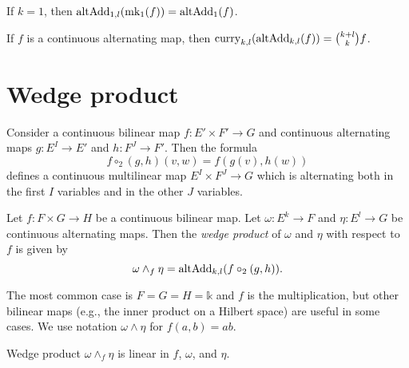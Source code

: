 \begin{theorem}
  If \(k = 1\), then \(\operatorname{altAdd}_{1, l}(\operatorname{mk_1}(f)) = \operatorname{altAdd}_{1}(f)\).
\end{theorem}

\begin{theorem}
  If \(f\) is a continuous alternating map, then \(\operatorname{curry}_{k, l}(\operatorname{altAdd}_{k, l}(f)) = \binom{k + l}{k}f\).
\end{theorem}

\section{Wedge product}%
\label{sec:wedge-product}

\begin{definition}
  Consider a continuous bilinear map \(f \colon E' \times F' \to G\)
  and continuous alternating maps \(g\colon E^{I}\to E'\) and \(h\colon F^{J}\to F'\).
  Then the formula
  \[
    f \circ_{2} (g, h)(v, w) = f(g(v), h(w))
  \]
  defines a continuous multilinear map \(E^{I}\times F^{J}\to G\)
  which is alternating both in the first \(I\) variables and in the other \(J\) variables.
\end{definition}

\begin{definition}
  Let \(f \colon F \times G \to H\) be a continuous bilinear map.
  Let \(\omega \colon E^{k} \to F\) and \(\eta\colon E^{l}\to G\) be continuous alternating maps.
  Then the \emph{wedge product} of \(\omega\) and \(\eta\) with respect to \(f\) is given by
  \[
    \omega \wedge_{f} \eta = \operatorname{altAdd}_{k, l}(f \circ_{2}(g, h)).
  \]
\end{definition}

The most common case is \(F = G = H = \mathbb k\) and \(f\) is the multiplication,
but other bilinear maps (e.g., the inner product on a Hilbert space) are useful in some cases.
We use notation \(\omega \wedge \eta\) for \(f(a, b) = ab\).


\begin{theorem}
  Wedge product \(\omega \wedge_{f} \eta\) is linear in \(f\), \(\omega\), and \(\eta\).
\end{theorem}

